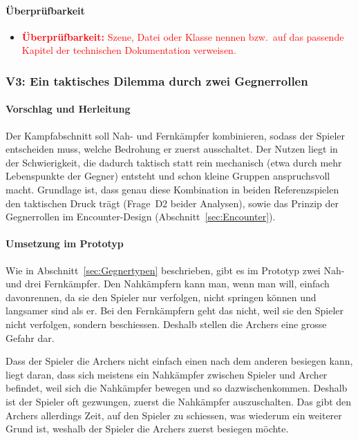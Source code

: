 \documentclass[../Main.tex]{subfiles}
\begin{document}
\paragraph{Überprüfbarkeit}
\begin{itemize}[leftmargin=1.5cm]
    \item \textcolor{red}{\textbf{Überprüfbarkeit:} Szene, Datei oder Klasse nennen bzw.\ auf das passende Kapitel der technischen Dokumentation verweisen.}
\end{itemize}

\subsubsection{V3: Ein taktisches Dilemma durch zwei Gegnerrollen} \label{sec:V3}

\paragraph{Vorschlag und Herleitung}
Der Kampfabschnitt soll Nah- und Fernkämpfer kombinieren, sodass der Spieler entscheiden muss, welche Bedrohung er zuerst ausschaltet. Der Nutzen liegt in der Schwierigkeit, die dadurch taktisch statt rein mechanisch (etwa durch mehr Lebenspunkte der Gegner) entsteht und schon kleine Gruppen anspruchsvoll macht. Grundlage ist, dass genau diese Kombination in beiden Referenzspielen den taktischen Druck trägt (Frage~D2 beider Analysen), sowie das Prinzip der Gegnerrollen im Encounter-Design (Abschnitt~\ref{sec:Encounter}).

\paragraph{Umsetzung im Prototyp}
Wie in Abschnitt~\ref{sec:Gegnertypen} beschrieben, gibt es im Prototyp zwei Nah- und drei Fernkämpfer. Den Nahkämpfern kann man, wenn man will, einfach davonrennen, da sie den Spieler nur verfolgen, nicht springen können und langsamer sind als er. Bei den Fernkämpfern geht das nicht, weil sie den Spieler nicht verfolgen, sondern beschiessen. Deshalb stellen die Archers eine grosse Gefahr dar.

Dass der Spieler die Archers nicht einfach einen nach dem anderen besiegen kann, liegt daran, dass sich meistens ein Nahkämpfer zwischen Spieler und Archer befindet, weil sich die Nahkämpfer bewegen und so dazwischenkommen. Deshalb ist der Spieler oft gezwungen, zuerst die Nahkämpfer auszuschalten. Das gibt den Archers allerdings Zeit, auf den Spieler zu schiessen, was wiederum ein weiterer Grund ist, weshalb der Spieler die Archers zuerst besiegen möchte.
\end{document}
